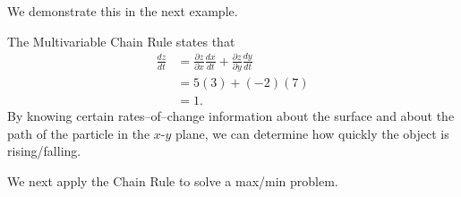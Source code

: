 We demonstrate this in the next example.

{The Multivariable Chain Rule states that 
\begin{align*}
\frac{dz}{dt} &= \frac{\partial z}{\partial x}\frac{dx}{dt} + \frac{\partial z}{\partial y}\frac{dy}{dt} \\
				&= 5(3)+(-2)(7) \\
				&=1.
\end{align*}
By knowing certain rates--of--change information about the surface and about the path of the particle in the $x$-$y$ plane, we can determine how quickly the object is rising/falling.}

We next apply the Chain Rule to solve a max/min problem.

